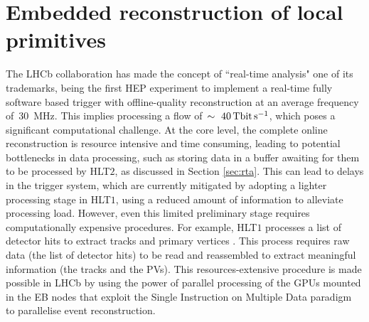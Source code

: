 
\chapter{Embedded reconstruction of local primitives}
\label{chp:retina}

The LHCb collaboration has made the concept of ``real-time analysis" one of its trademarks, being the first HEP experiment to implement a real-time fully software based trigger with offline-quality reconstruction at an average frequency of~\SI{30}{\mega\hertz}. This implies processing a flow of~$\sim~\SI{40}{\tera\bit\per\second}$, which poses a significant computational challenge.
At the core level, the complete online reconstruction is resource intensive and time consuming, leading to potential bottlenecks in data processing, such as storing data in a buffer awaiting for them to be processed by HLT$2$, as discussed in Section \ref{sec:rta}. This can lead to delays in the trigger system, which are currently mitigated by adopting a lighter processing stage in HLT$1$, using a reduced amount of information to alleviate processing load.
However, even this limited preliminary stage requires computationally expensive procedures. For example, HLT$1$ processes a list of detector hits to extract tracks and primary vertices \cite{https://doi.org/10.5281/zenodo.8119731}. This process requires raw data (the list of detector hits) to be read and reassembled to extract meaningful information (the tracks and the PVs). This resources-extensive procedure is made possible in LHCb by using the power of parallel processing of the GPUs mounted in the EB nodes that exploit the Single Instruction on Multiple Data paradigm~\cite{5009071} to parallelise event reconstruction. %

